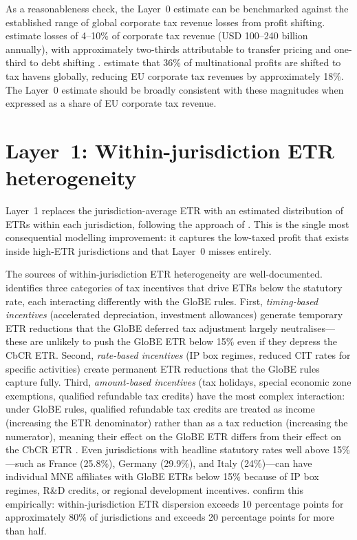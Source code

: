 \documentclass[11pt,a4paper]{article}
\begin{document}
As a reasonableness check, the Layer~0 estimate can be benchmarked against the established range of global corporate tax revenue losses from profit shifting. \citet{johansson2017} estimate losses of 4--10\% of corporate tax revenue (USD 100--240 billion annually), with approximately two-thirds attributable to transfer pricing and one-third to debt shifting \citep{riedel2018,torslov2022}. \citet{torslov2022} estimate that 36\% of multinational profits are shifted to tax havens globally, reducing EU corporate tax revenues by approximately 18\%. The Layer~0 estimate should be broadly consistent with these magnitudes when expressed as a share of EU corporate tax revenue.

\section{Layer~1: Within-jurisdiction ETR heterogeneity}\label{sec:layer1}

Layer~1 replaces the jurisdiction-average ETR with an estimated distribution of ETRs within each jurisdiction, following the approach of \citet{hugger2025}. This is the single most consequential modelling improvement: it captures the low-taxed profit that exists inside high-ETR jurisdictions and that Layer~0 misses entirely.

The sources of within-jurisdiction ETR heterogeneity are well-documented. \citet{liotti2022} identifies three categories of tax incentives that drive ETRs below the statutory rate, each interacting differently with the GloBE rules. First, \emph{timing-based incentives} (accelerated depreciation, investment allowances) generate temporary ETR reductions that the GloBE deferred tax adjustment largely neutralises---these are unlikely to push the GloBE ETR below 15\% even if they depress the CbCR ETR. Second, \emph{rate-based incentives} (IP box regimes, reduced CIT rates for specific activities) create permanent ETR reductions that the GloBE rules capture fully. Third, \emph{amount-based incentives} (tax holidays, special economic zone exemptions, qualified refundable tax credits) have the most complex interaction: under GloBE rules, qualified refundable tax credits are treated as income (increasing the ETR denominator) rather than as a tax reduction (increasing the numerator), meaning their effect on the GloBE ETR differs from their effect on the CbCR ETR \citep{hanlon2023}. Even jurisdictions with headline statutory rates well above 15\%---such as France (25.8\%), Germany (29.9\%), and Italy (24\%)---can have individual MNE affiliates with GloBE ETRs below 15\% because of IP box regimes, R\&D credits, or regional development incentives. \citet{hugger2025} confirm this empirically: within-jurisdiction ETR dispersion exceeds 10 percentage points for approximately 80\% of jurisdictions and exceeds 20 percentage points for more than half.
\end{document}
